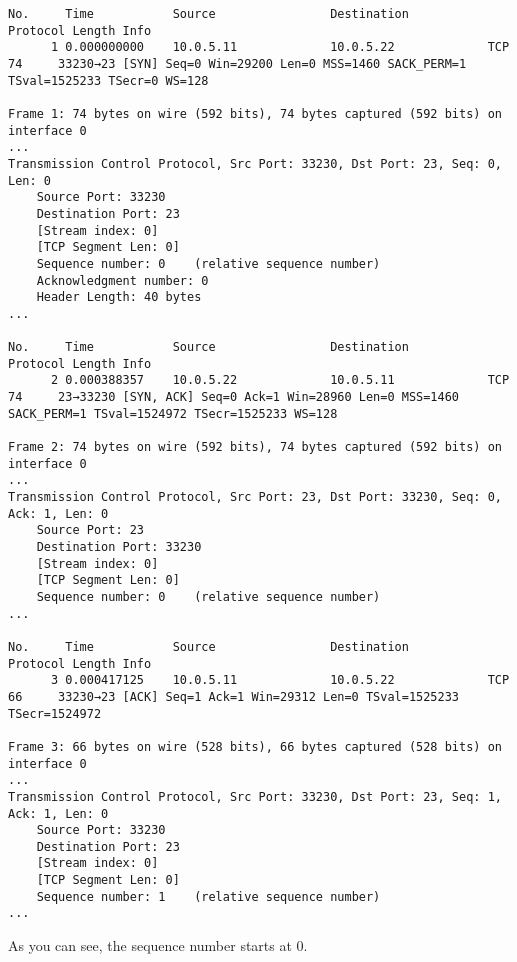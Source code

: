 \begin{verbatim}
No.     Time           Source                Destination           Protocol Length Info
      1 0.000000000    10.0.5.11             10.0.5.22             TCP      74     33230→23 [SYN] Seq=0 Win=29200 Len=0 MSS=1460 SACK_PERM=1 TSval=1525233 TSecr=0 WS=128

Frame 1: 74 bytes on wire (592 bits), 74 bytes captured (592 bits) on interface 0
...
Transmission Control Protocol, Src Port: 33230, Dst Port: 23, Seq: 0, Len: 0
    Source Port: 33230
    Destination Port: 23
    [Stream index: 0]
    [TCP Segment Len: 0]
    Sequence number: 0    (relative sequence number)
    Acknowledgment number: 0
    Header Length: 40 bytes
...

No.     Time           Source                Destination           Protocol Length Info
      2 0.000388357    10.0.5.22             10.0.5.11             TCP      74     23→33230 [SYN, ACK] Seq=0 Ack=1 Win=28960 Len=0 MSS=1460 SACK_PERM=1 TSval=1524972 TSecr=1525233 WS=128

Frame 2: 74 bytes on wire (592 bits), 74 bytes captured (592 bits) on interface 0
...
Transmission Control Protocol, Src Port: 23, Dst Port: 33230, Seq: 0, Ack: 1, Len: 0
    Source Port: 23
    Destination Port: 33230
    [Stream index: 0]
    [TCP Segment Len: 0]
    Sequence number: 0    (relative sequence number)
...

No.     Time           Source                Destination           Protocol Length Info
      3 0.000417125    10.0.5.11             10.0.5.22             TCP      66     33230→23 [ACK] Seq=1 Ack=1 Win=29312 Len=0 TSval=1525233 TSecr=1524972

Frame 3: 66 bytes on wire (528 bits), 66 bytes captured (528 bits) on interface 0
...
Transmission Control Protocol, Src Port: 33230, Dst Port: 23, Seq: 1, Ack: 1, Len: 0
    Source Port: 33230
    Destination Port: 23
    [Stream index: 0]
    [TCP Segment Len: 0]
    Sequence number: 1    (relative sequence number)
...

\end{verbatim}

As you can see, the sequence number starts at 0.